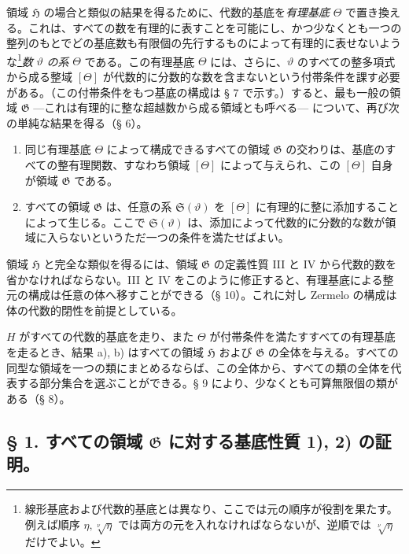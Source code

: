 領域 $\mathfrak H$ の場合と類似の結果を得るために、代数的基底を\emph{有理基底} $\Theta$ で置き換える。これは、すべての数を有理的に表すことを可能にし、かつ少なくとも一つの整列のもとでどの基底数も有限個の先行するものによって有理的に表せないような\footnote{線形基底および代数的基底とは異なり、ここでは元の順序が役割を果たす。例えば順序 $\eta,\sqrt[\nu]{\eta}$ では両方の元を入れなければならないが、逆順では $\sqrt[\nu]{\eta}$ だけでよい。}\emph{数} $\vartheta$ \emph{の系} $\Theta$ である。この有理基底 $\Theta$ には、さらに、$\vartheta$ のすべての整多項式から成る整域 $[\Theta]$ が代数的に分数的な数を含まないという付帯条件を課す必要がある。（この付帯条件をもつ基底の構成は § 7 で示す。）すると、最も一般の領域 $\mathfrak G$ ---これは有理的に整な超越数から成る領域とも呼べる--- について、再び次の単純な結果を得る（§ 6）。
\begin{enumerate}
\item[a)] 同じ有理基底 $\Theta$ によって構成できるすべての領域 $\mathfrak G$ の交わりは、基底のすべての整有理関数、すなわち領域 $[\Theta]$ によって与えられ、この $[\Theta]$ 自身が領域 $\mathfrak G$ である。
\item[b)] すべての領域 $\mathfrak G$ は、任意の系 $\mathfrak S(\vartheta)$ を $[\Theta]$ に有理的に整に添加することによって生じる。ここで $\mathfrak S(\vartheta)$ は、添加によって代数的に分数的な数が領域に入らないというただ一つの条件を満たせばよい。
\end{enumerate}

領域 $\mathfrak H$ と完全な類似を得るには、領域 $\mathfrak G$ の定義性質 III と IV から代数的数を省かなければならない。III と IV をこのように修正すると、有理基底による整元の構成は任意の体へ移すことができる（§ 10）。これに対し Zermelo の構成は体の代数的閉性を前提としている。

$H$ がすべての代数的基底を走り、また $\Theta$ が付帯条件を満たすすべての有理基底を走るとき、結果 a), b) はすべての領域 $\mathfrak H$ および $\mathfrak G$ の全体を与える。すべての同型な領域を一つの類にまとめるならば、この全体から、すべての類の全体を代表する部分集合を選ぶことができる。§ 9 により、少なくとも可算無限個の類がある（§ 8）。

\subsection*{§ 1. すべての領域 $\mathfrak G$ に対する基底性質 1), 2) の証明。}


